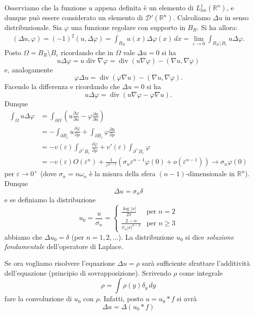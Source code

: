 \documentclass[italian,a4paper,oneside,headinclude]{scrbook}
\newcommand{\eps}{\varepsilon}
\renewcommand{\phi}{\varphi}
\newcommand{\loc}{\mathit{loc}}
\newcommand{\D}{\mathcal D}
\newcommand{\RR}{\mathbb R}
\newcommand{\abs}[1]{{\left|#1\right|}}
\DeclareMathOperator{\divergence}{div}
\renewcommand{\div}{\divergence}
\begin{document}
Osserviamo che la funzione $u$ appena definita è un elemento di
$L^1_{\loc}(\RR^n)$, e dunque può essere considerato un elemento di
$\D'(\RR^n)$. Calcoliamo $\Delta u$ in senso distribuzionale. Sia
$\phi$ una funzione regolare con supporto in $B_R$. Si ha allora:
\begin{align*}
  (\Delta u, \phi)
  = (-1)^2 (u, \Delta \phi)
  = \int_{B_R} u(x) \Delta \phi(x)\, dx
  = \lim_{\eps\to 0}\int_{B_R\setminus B_\eps} u \Delta \phi.
\end{align*}
Posto $\Omega = B_R\setminus B_\eps$ ricordando che in $\Omega$ vale
$\Delta u=0$ si ha
\[
u \Delta \phi = u \div \nabla \phi = \div(u \nabla \phi) - (\nabla
u, \nabla \phi)
\]
e, analogamente
\[
\phi \Delta u = \div(\phi \nabla u) - (\nabla u, \nabla \phi).
\]
Facendo la differenza e ricordando che $\Delta u=0$ si ha
\[
u \Delta \phi = \div(u\nabla \phi - \phi \nabla u).
\]
Dunque
\begin{align*}
\int_\Omega u \Delta \phi &= \int_{\partial \Omega} \left( u \frac{\partial
  \phi}{\partial n}- \phi\frac{\partial u}{\partial n}\right)\\
&= -\int_{\partial B_\eps} u \frac {\partial \phi}{\partial \rho}+
\int_{\partial B_\eps} \phi \frac{\partial u}{\partial \rho}\\
&= -v(\eps) \int_{\partial^+ B_\eps} \frac{\partial \phi}{\partial
  \rho} + v'(\eps)\int_{\partial^+ B_\eps} \phi\\
&= -v(\eps) O(\eps^n) + \frac{1}{\eps^{n-1}} (\sigma_n \eps^{n-1}\phi(0) +
o(\eps^{n-1}))
\to \sigma_n \phi(0)
\end{align*}
per $\eps \to 0^+$ (dove $\sigma_n = n\omega_n$ è la misura della
sfera $(n-1)$-dimensionale in $\RR^n$).
Dunque
\[
\Delta u = \sigma_n \delta
\]
e se definiamo la distribuzione
\[
u_0 = \frac{u}{\sigma_n} =
\begin{cases}
  \frac{\log \abs{x}}{2\pi} & \text{per $n=2$}\\
  \frac{2-n}{\sigma_n \abs{x}^{n-2}} & \text{per $n\geq 3$}
\end{cases}
\]
abbiamo che $\Delta u_0 = \delta$ (per $n=1,2,\dots$). La
distribuzione $u_0$ si dice \emph{soluzione fondamentale}
dell'operatore di Laplace.

Se ora vogliamo risolvere l'equazione $\Delta u = \rho$ sarà sufficiente
sfruttare l'additività dell'equazione (principio di sovrapposizione).
Scrivendo $\rho$ come integrale
\[
\rho = \int \rho(y) \delta_y \, dy
\]
fare la convoluzione di $u_0$ con $\rho$. Infatti, posto $u= u_0 * f$
si avrà
\[
\Delta u = \Delta (u_0 * f)
\]
\end{document}
